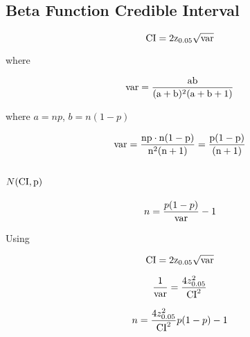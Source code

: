 
\subsection{Beta Function Credible Interval}


$$\rm{CI} = 2 z_{0.05} \sqrt{\rm{var}}$$

where

$$\rm{var}=\frac{ab}{(a + b)^2(a + b +1)}$$

where $a = n p$, $b = n (1-p)$

$$\rm{var} = \frac{np \cdot n(1-p)}{n^2(n +1)} = \frac{p(1-p)}{(n+1)}$$

\subsection{$N(\rm{CI}, p)$}



$$n = \frac{p(1-p)}{\rm{var}} - 1$$

Using 

$$\rm{CI} = 2 z_{0.05} \sqrt{\rm{var}}$$


$$\frac{1}{\rm{var}} = \frac{4 z_{0.05}^2}{\rm{CI}^2}$$


$$n = \frac{4 z_{0.05}^2}{\rm{CI}^2}p(1-p) - 1$$
